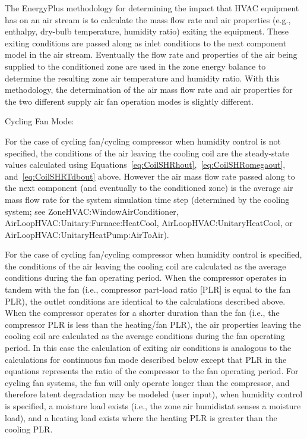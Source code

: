The EnergyPlus methodology for determining the impact that HVAC equipment has on an air stream is to calculate the mass flow rate and air properties (e.g., enthalpy, dry-bulb temperature, humidity ratio) exiting the equipment. These exiting conditions are passed along as inlet conditions to the next component model in the air stream. Eventually the flow rate and properties of the air being supplied to the conditioned zone are used in the zone energy balance to determine the resulting zone air temperature and humidity ratio. With this methodology, the determination of the air mass flow rate and air properties for the two different supply air fan operation modes is slightly different.

Cycling Fan Mode:

For the case of cycling fan/cycling compressor when humidity control is not specified, the conditions of the air leaving the cooling coil are the steady-state values calculated using Equations~\ref{eq:CoilSHRhout},~\ref{eq:CoilSHRomegaout}, and~\ref{eq:CoilSHRTdbout} above. However the air mass flow rate passed along to the next component (and eventually to the conditioned zone) is the average air mass flow rate for the system simulation time step (determined by the cooling system; see ZoneHVAC:WindowAirConditioner, AirLoopHVAC:Unitary:Furnace:HeatCool, AirLoopHVAC:UnitaryHeatCool, or AirLoopHVAC:UnitaryHeatPump:AirToAir).

For the case of cycling fan/cycling compressor when humidity control is specified, the conditions of the air leaving the cooling coil are calculated as the average conditions during the fan operating period. When the compressor operates in tandem with the fan (i.e., compressor part-load ratio {[}PLR{]} is equal to the fan PLR), the outlet conditions are identical to the calculations described above. When the compressor operates for a shorter duration than the fan (i.e., the compressor PLR is less than the heating/fan PLR), the air properties leaving the cooling coil are calculated as the average conditions during the fan operating period. In this case the calculation of exiting air conditions is analogous to the calculations for continuous fan mode described below except that PLR in the equations represents the ratio of the compressor to the fan operating period. For cycling fan systems, the fan will only operate longer than the compressor, and therefore latent degradation may be modeled (user input), when humidity control is specified, a moisture load exists (i.e., the zone air humidistat senses a moisture load), and a heating load exists where the heating PLR is greater than the cooling PLR.

